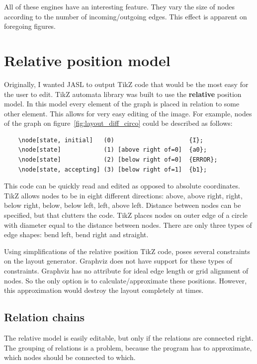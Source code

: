 \documentclass{ctuthesis}
\begin{document}
All of these engines have an interesting feature. They vary the size of nodes according to the number of incoming/outgoing edges. This effect is apparent on foregoing figures.

\section{Relative position model}
\label{sec:relpos}
Originally, I wanted JASL to output TikZ code that would be the most easy for the user to edit. TikZ automata library was built to use the \textbf{relative} position model. In this model every element of the graph is placed in relation to some other element. This allows for very easy editing of the image. For example, nodes of the graph on figure~\ref{fig:layout_diff_circo} could be described as follows:

\begin{verbatim}
	\node[state, initial] 	(0) 					{I};
	\node[state] 			(1) [above right of=0] 	{a0};
	\node[state] 			(2) [below right of=0] 	{ERROR};
	\node[state, accepting] (3) [below right of=1] 	{b1};
\end{verbatim}

This code can be quickly read and edited as opposed to absolute coordinates. TikZ allows nodes to be in eight different directions: above, above right, right, below right, below, below left, left, above left. Distance between nodes can be specified, but that clutters the code. TikZ places nodes on outer edge of a circle with diameter equal to the distance between nodes. There are only three types of edge shapes: bend left, bend right and straight. 

Using simplifications of the relative position TikZ code, poses several constraints on the layout generator. Graphviz does not have support for these types of constraints. Graphviz has no attribute for ideal edge length or grid alignment of nodes. So the only option is to calculate/approximate these positions. However, this approximation would destroy the layout completely at times. 

\subsection{Relation chains}
The relative model is easily editable, but only if the relations are connected right. The grouping of relations is a problem, because the program has to approximate, which nodes should be connected to which.
\end{document}
